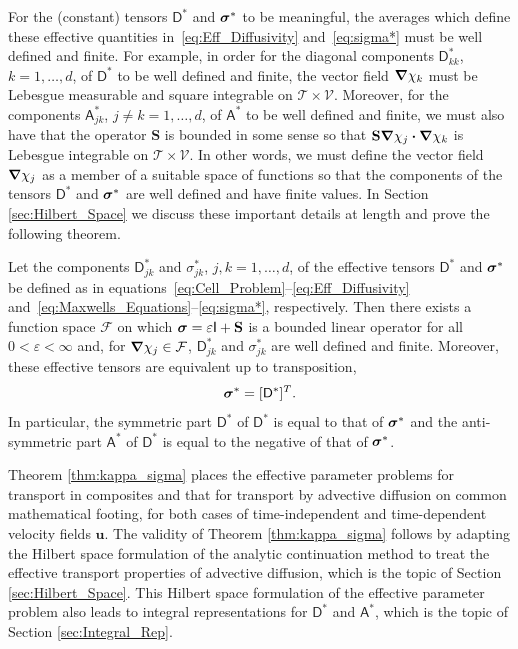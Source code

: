 \documentclass[leqno,onefignum,onetabnum]{siamltex1213}
\newcommand{\Sb}{\mathbf{S}}
\newcommand{\Tc}{\mathcal{T}}
\newcommand{\Vc}{\mathcal{V}}
\newcommand{\Fc}{\mathcal{F}}
\newcommand{\Dm}{\mathsf{D}}
\newcommand{\Am}{\mathsf{A}}
\newcommand{\Ib}{\mathsf{I}}
\newcommand\bsig{\mbox{\boldmath${\sigma}$}}
\newcommand\bnabla{\mbox{\boldmath${\nabla}$}}
\providecommand\bcdot{\boldsymbol{\cdot}}
\newcommand{\vecu}{\boldsymbol{u}}
\begin{document}
For the (constant) tensors $\Dm^*$ and $\bsig^*$ to be
meaningful, the averages which define these effective quantities
in~\eqref{eq:Eff_Diffusivity} and~\eqref{eq:sigma*} must be well
defined 
and finite. For example, in order for the diagonal components
$\Dm^*_{kk}$, $k=1,\ldots,d$, of $\Dm^*$ to be well defined and finite,
the vector field $\bnabla \chi_k$ must be Lebesgue measurable 
and square integrable on $\Tc\times\Vc$. Moreover, for the components
$\Am^*_{jk}$, $j\neq k=1,\ldots,d$, of $\Am^*$ to be well defined and
finite, we must also have that the operator $\Sb$ is bounded in some
sense so that $\Sb\bnabla \chi_j\bcdot\bnabla \chi_k$ is Lebesgue integrable on
$\Tc\times\Vc$. In other words, we must define the vector field
$\bnabla \chi_j$ as a member of a suitable space of functions so that the
components of the tensors $\Dm^*$ and $\bsig^*$ are well defined and
have finite values. In Section \ref{sec:Hilbert_Space} we discuss
these important details at length and prove the following theorem. 
%
\begin{theorem}\label{thm:kappa_sigma}
%
Let the components $\Dm^*_{jk}$ and $\sigma^*_{jk}$, $j,k=1,\ldots,d$, of the
effective tensors $\Dm^*$ and $\bsig^*$ be defined as in
equations~\eqref{eq:Cell_Problem}--\eqref{eq:Eff_Diffusivity}
and~\eqref{eq:Maxwells_Equations}--\eqref{eq:sigma*},
respectively. Then 
there exists a function space $\Fc$ on which $\bsig=\varepsilon\Ib+\Sb$ is a
bounded linear operator for all $0<\varepsilon<\infty$ and, for $\bnabla \chi_j\in\Fc$,
$\Dm^*_{jk}$ and $\sigma^*_{jk}$ are well defined and finite.
Moreover, these effective tensors are
equivalent up to transposition,  
% 
\begin{align}\label{eq:Eff_Equiv}
  \bsig^*=[\Dm^*]^T.
\end{align}
%
In particular, the symmetric part $\Dm^*$ of $\Dm^*$ is equal to
that of $\bsig^*$ and the anti-symmetric part $\Am^*$ of $\Dm^*$
is equal to the negative of that of $\bsig^*$.
%
\end{theorem}
%



Theorem \ref{thm:kappa_sigma} places the effective parameter problems
for transport in composites and that for transport by advective
diffusion on common mathematical footing, for both cases of  
time-independent and time-dependent velocity fields $\vecu $. The
validity of Theorem \ref{thm:kappa_sigma} follows by adapting the
Hilbert space formulation of the analytic continuation method to treat the effective transport
properties of advective diffusion, which is the topic of Section
\ref{sec:Hilbert_Space}. This Hilbert space formulation of the
effective parameter problem also leads to integral representations for
$\Dm^*$ and $\Am^*$, which is the topic of Section
\ref{sec:Integral_Rep}.              
\end{document}
